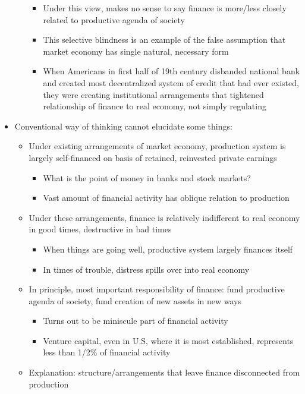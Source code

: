 \begin{itemize}
\begin{itemize}
    \begin{itemize}
    \tightlist
    \item
      Under this view, makes no sense to say finance is more/less
      closely related to productive agenda of society
    \item
      This selective blindness is an example of the false assumption
      that market economy has single natural, necessary form
    \item
      When Americans in first half of 19th century disbanded national
      bank and created most decentralized system of credit that had ever
      existed, they were creating institutional arrangements that
      tightened relationship of finance to real economy, not simply
      regulating
    \end{itemize}
  \end{itemize}
\item
  Conventional way of thinking cannot elucidate some things:

  \begin{itemize}
  \tightlist
  \item
    Under existing arrangements of market economy, production system is
    largely self-financed on basis of retained, reinvested private
    earnings

    \begin{itemize}
    \tightlist
    \item
      What is the point of money in banks and stock markets?
    \item
      Vast amount of financial activity has oblique relation to
      production
    \end{itemize}
  \item
    Under these arrangements, finance is relatively indifferent to real
    economy in good times, destructive in bad times

    \begin{itemize}
    \tightlist
    \item
      When things are going well, productive system largely finances
      itself
    \item
      In times of trouble, distress spills over into real economy
    \end{itemize}
  \item
    In principle, most important responsibility of finance: fund
    productive agenda of society, fund creation of new assets in new
    ways

    \begin{itemize}
    \tightlist
    \item
      Turns out to be miniscule part of financial activity
    \item
      Venture capital, even in U.S, where it is most established,
      represents less than 1/2\% of financial activity
    \end{itemize}
  \item
    Explanation: structure/arrangements that leave finance disconnected
    from production


\end{itemize}
\end{itemize}
